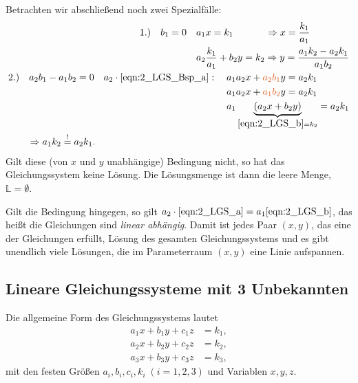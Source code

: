 Betrachten wir abschließend noch zwei Spezialfälle: 
\begin{align}
    \begin{split}
        &1.)\quad b_1 = 0  \quad a_1 x = k_1 \hphantom{\frac{k_1}{a_1} + b_2}\Rightarrow x = \frac{k_1}{a_1} \\
        &\hphantom{1.)\quad b_1 = 0 } \quad a_2 \frac{k_1}{a_1} + b_2 y = k_2 \Rightarrow y = \frac{a_1 k_2 - a_2 k_1}{a_1 b_2}
    \end{split}\\
    \begin{split}
        &2.)\quad a_2 b_1 - a_1 b_2 = 0 \quad a_2 \cdot \eqref{eqn:2_LGS_Bsp_a}: \quad a_1 a_2 x + \textcolor{PAForange}{a_2 b_1} y = a_2 k_1 \\
        &\hphantom{2.)\quad a_2 b_1 - a_1 b_2 = 0 \quad a_2 \cdot \eqref{eqn:2_LGS_Bsp_a}:}\quad\; a_1 a_2 x + \textcolor{PAForange}{a_1 b_2}y = a_2 k_1  \\
        &\hphantom{2.)\quad a_2 b_1 - a_1 b_2 = 0 \quad a_2 \cdot \eqref{eqn:2_LGS_Bsp_a}:}\quad\; a_1 \underbrace{(a_2 x + b_2 y)}_{\eqref{eqn:2_LGS_b} = k_2} = a_2 k_1 \\
        &\qquad \Rightarrow a_1 k_2 \overset{!}{=} a_2 k_1.
    \end{split}
\end{align}
Gilt diese (von $x$ und $y$ unabhängige) Bedingung nicht, so hat das Gleichungssystem keine Lösung. Die Lösungsmenge ist dann die leere Menge, $\mathbb{L} = \emptyset$. 

Gilt die Bedingung hingegen, so gilt $a_2 \cdot \eqref{eqn:2_LGS_a} = a_1 \eqref{eqn:2_LGS_b}$, das heißt die Gleichungen sind \emph{linear abhängig}. Damit ist jedes Paar $(x,y)$, das eine der Gleichungen erfüllt, Lösung des gesamten Gleichungssystems und es gibt unendlich viele Lösungen, die im Parameterraum $(x,y)$ eine Linie aufspannen. 


\subsection{Lineare Gleichungssysteme mit 3 Unbekannten}

Die allgemeine Form des Gleichungssystems lautet 
\begin{subequations}
    \begin{align}
        a_1 x + b_1 y + c_1 z &= k_1, \label{eqn:2_LGS_3a}\\
        a_2 x + b_2 y + c_2 z &= k_2, \label{eqn:2_LGS_3b}\\
        a_3 x + b_3 y + c_3 z &= k_3, \label{eqn:2_LGS_3c}
    \end{align}
\end{subequations}
mit den festen Größen $a_i, b_i, c_i, k_i \; (i=1,2,3)$ und Variablen $x,y,z$. 

